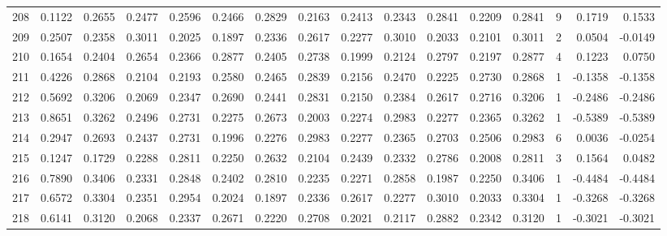 \begin{tabular}{lrrrrrrrrrrrrrrr}
208 &      0.1122 &  0.2655 &  0.2477 &  0.2596 &  0.2466 &  0.2829 &  0.2163 &  0.2413 &  0.2343 &  0.2841 &   0.2209 &     0.2841 &      9 &                    0.1719 &                     0.1533 \\
209 &      0.2507 &  0.2358 &  0.3011 &  0.2025 &  0.1897 &  0.2336 &  0.2617 &  0.2277 &  0.3010 &  0.2033 &   0.2101 &     0.3011 &      2 &                    0.0504 &                    -0.0149 \\
210 &      0.1654 &  0.2404 &  0.2654 &  0.2366 &  0.2877 &  0.2405 &  0.2738 &  0.1999 &  0.2124 &  0.2797 &   0.2197 &     0.2877 &      4 &                    0.1223 &                     0.0750 \\
211 &      0.4226 &  0.2868 &  0.2104 &  0.2193 &  0.2580 &  0.2465 &  0.2839 &  0.2156 &  0.2470 &  0.2225 &   0.2730 &     0.2868 &      1 &                   -0.1358 &                    -0.1358 \\
212 &      0.5692 &  0.3206 &  0.2069 &  0.2347 &  0.2690 &  0.2441 &  0.2831 &  0.2150 &  0.2384 &  0.2617 &   0.2716 &     0.3206 &      1 &                   -0.2486 &                    -0.2486 \\
213 &      0.8651 &  0.3262 &  0.2496 &  0.2731 &  0.2275 &  0.2673 &  0.2003 &  0.2274 &  0.2983 &  0.2277 &   0.2365 &     0.3262 &      1 &                   -0.5389 &                    -0.5389 \\
214 &      0.2947 &  0.2693 &  0.2437 &  0.2731 &  0.1996 &  0.2276 &  0.2983 &  0.2277 &  0.2365 &  0.2703 &   0.2506 &     0.2983 &      6 &                    0.0036 &                    -0.0254 \\
215 &      0.1247 &  0.1729 &  0.2288 &  0.2811 &  0.2250 &  0.2632 &  0.2104 &  0.2439 &  0.2332 &  0.2786 &   0.2008 &     0.2811 &      3 &                    0.1564 &                     0.0482 \\
216 &      0.7890 &  0.3406 &  0.2331 &  0.2848 &  0.2402 &  0.2810 &  0.2235 &  0.2271 &  0.2858 &  0.1987 &   0.2250 &     0.3406 &      1 &                   -0.4484 &                    -0.4484 \\
217 &      0.6572 &  0.3304 &  0.2351 &  0.2954 &  0.2024 &  0.1897 &  0.2336 &  0.2617 &  0.2277 &  0.3010 &   0.2033 &     0.3304 &      1 &                   -0.3268 &                    -0.3268 \\
218 &      0.6141 &  0.3120 &  0.2068 &  0.2337 &  0.2671 &  0.2220 &  0.2708 &  0.2021 &  0.2117 &  0.2882 &   0.2342 &     0.3120 &      1 &                   -0.3021 &                    -0.3021 \\

\end{tabular}
